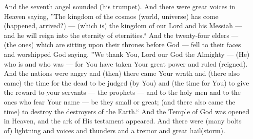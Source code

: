 \begin{pages}
\begin{Leftside}
		\pend
		\pstart
		And the seventh angel sounded (his trumpet). And there were great voices in Heaven saying, ''The kingdom of the cosmos (world, universe) has come (happened, arrived?) — (which is) the kingdom of our Lord and his Messiah — and he will reign into the eternity of eternities.`` And the twenty-four elders — (the ones) which are sitting upon their thrones before God — fell to their faces and worshipped God saying, ''We thank You, Lord our God the Almighty — (He) who is and who was — for You have taken Your great power and ruled (reigned). And the nations were angry and (then) there came Your wrath and (there also came) the time for the dead to be judged (by You) and (the time for You) to give the reward to your servants — the prophets — and to the holy men and to the ones who fear Your name — be they small or great; (and there also came the time) to destroy the destroyers of the Earth.``
		\pend
		\pstart
		And the Temple of God was opened in Heaven, and the ark of His testament appeared. And there were (many bolts of) lightning and voices and thunders and a tremor and great hail(storm). 
		\pend
        \endnumbering
    \end{Leftside}

\end{pages} 
\Pages

